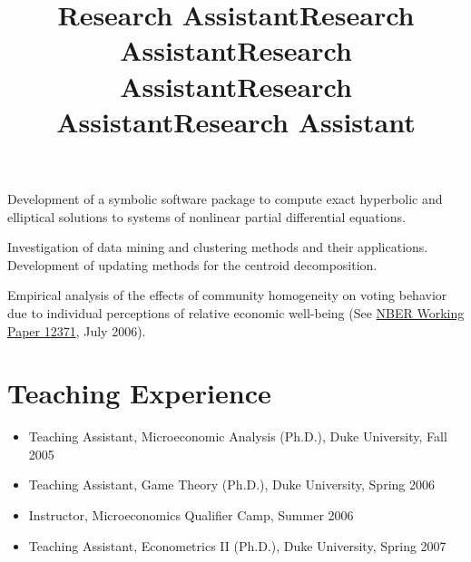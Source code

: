 \documentclass[overlapped,line,letterpaper]{res}
\begin{document}
\begin{resume}
\title{Research Assistant}
\begin{position}
  Development of a symbolic software package to compute exact
  hyperbolic and elliptical solutions to systems of nonlinear partial
  differential equations.
\end{position}

\title{Research Assistant}
\begin{position}
  Investigation of data mining and clustering methods and their
  applications. Development of updating methods for the centroid
  decomposition.
\end{position}

\title{Research Assistant}
\begin{position}
  Empirical analysis of the effects of community homogeneity on voting
  behavior due to individual perceptions of relative economic
  well-being
  (See \href{http://www.nber.org/papers/w12371}{NBER Working Paper 12371},
  July 2006).
\end{position}

\title{Research Assistant}
\begin{position}
\end{position}

\title{Research Assistant}
\begin{position}
\end{position}


\section{\bf Teaching Experience}

\begin{itemize}
\item Teaching Assistant, Microeconomic Analysis (Ph.D.), Duke
  University, Fall 2005
\item Teaching Assistant, Game Theory (Ph.D.), Duke University, Spring 2006
\item Instructor, Microeconomics Qualifier Camp, Summer 2006
\item Teaching Assistant, Econometrics II (Ph.D.), Duke University, Spring 2007
\end{itemize}


\end{resume}
\end{document}
